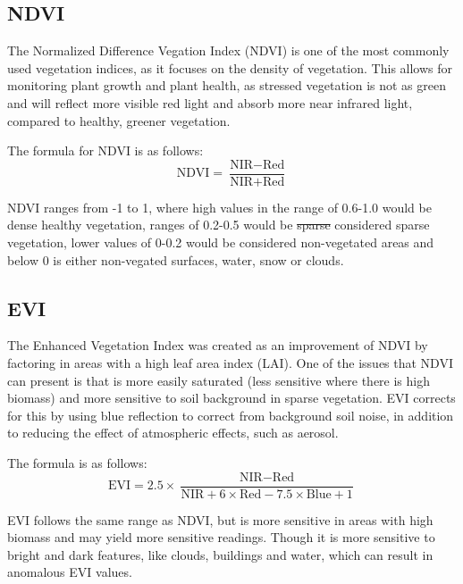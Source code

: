 \subsection{NDVI}\label{NDVI}
The Normalized Difference Vegation Index (NDVI) is one of the most commonly used vegetation indices, as it focuses on the density of vegetation. This allows for monitoring plant growth and plant health, as stressed vegetation is not as green and will reflect more visible red light and absorb more near infrared light, compared to healthy, greener vegetation\cite{softfarm_vegetation_indices}.

The formula for NDVI is as follows:
\begin{equation}
    \text{NDVI} = \frac{\text{NIR} - \text{Red}}{\text{NIR} + \text{Red}}
    \label{eq:ndvi}
\end{equation}

NDVI ranges from -1 to 1, where high values in the range of 0.6-1.0 would be dense healthy vegetation, ranges of 0.2-0.5 would be \sout{sparse} considered sparse vegetation, lower values of 0-0.2 would be considered non-vegetated areas and below 0 is either non-vegated surfaces, water, snow or clouds\cite{NDVIRanges}.

\subsection{EVI}\label{EVI}
The Enhanced Vegetation Index was created as an improvement of NDVI by factoring in areas with a high leaf area index (LAI). One of the issues that NDVI can present is that is more easily saturated (less sensitive where there is high biomass) and more sensitive to soil background in sparse vegetation. EVI corrects for this by using blue reflection to correct from background soil noise, in addition to reducing the effect of atmospheric effects, such as aerosol\cite{softfarm_vegetation_indices}.

The formula is as follows:
\begin{equation}
    \text{EVI} = 2.5 \times \frac{\text{NIR} - \text{Red}}{\text{NIR} + 6 \times \text{Red} - 7.5 \times \text{Blue} + 1} \label{eq:evi}
\end{equation}

EVI follows the same range as NDVI, but is more sensitive in areas with high biomass and may yield more sensitive readings\cite{EVIRanges}. Though it is more sensitive to bright and dark features, like clouds, buildings and water, which can result in anomalous EVI values\cite{softfarm_vegetation_indices}.


